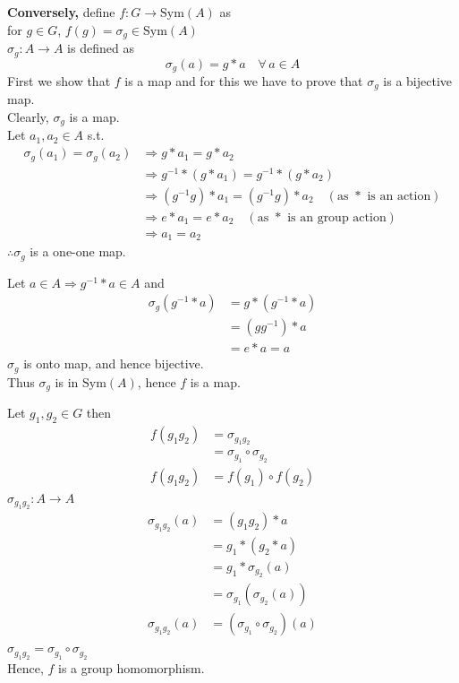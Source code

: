 \documentclass[11pt]{article}
\begin{document}
\newpage
\noindent \textbf{Conversely,} define $f : G \to \text{Sym}(A)$ as \\
for $g \in G$, $f(g) = \sigma_g \in \text{Sym}(A)$ \\
$\sigma_g : A \to A$ is defined as
\[
\sigma_g(a) = g * a \quad \forall\, a \in A
\]
First we show that $f$ is a map and for this we have to prove that $\sigma_g$ is a bijective map. \\
Clearly, $\sigma_g$ is a map. \\
Let $a_1, a_2 \in A$ s.t.
\begin{align*}
\sigma_g(a_1) = \sigma_g(a_2) &\Rightarrow g * a_1 = g * a_2 \\
&\Rightarrow g^{-1} * (g * a_1) = g^{-1} * (g * a_2) \\
&\Rightarrow (g^{-1} g) * a_1 = (g^{-1} g) * a_2 \quad (\text{as } * \text{ is an action}) \\
&\Rightarrow e * a_1 = e * a_2 \quad (\text{as } * \text{ is an group action}) \\
&\Rightarrow a_1 = a_2
\end{align*}
$\therefore \sigma_g$ is a one-one map.

\noindent Let $a \in A \Rightarrow g^{-1} * a \in A$ and
\begin{align*}
\sigma_g(g^{-1} * a) &= g * (g^{-1} * a) \\
&= (g g^{-1}) * a \\
&= e * a = a
\end{align*}
$\sigma_g$ is onto map, and hence bijective. \\
Thus $\sigma_g$ is in $\text{Sym}(A)$, hence $f$ is a map.

\noindent Let $g_1, g_2 \in G$ then
\begin{align*}
f(g_1 g_2) &= \sigma_{g_1 g_2} \\
&= \sigma_{g_1} \circ \sigma_{g_2} \\
f(g_1 g_2) &= f(g_1) \circ f(g_2)
\end{align*}
$\sigma_{g_1 g_2} : A \to A$
\begin{align*}
\sigma_{g_1 g_2}(a) &= (g_1 g_2) * a \\
&= g_1 * (g_2 * a) \\
&= g_1 * \sigma_{g_2}(a) \\
&= \sigma_{g_1}(\sigma_{g_2}(a)) \\
\sigma_{g_1 g_2}(a) &= (\sigma_{g_1} \circ \sigma_{g_2})(a)
\end{align*}
$\sigma_{g_1 g_2} = \sigma_{g_1} \circ \sigma_{g_2}$ \\
Hence, $f$ is a group homomorphism.
\end{document}
